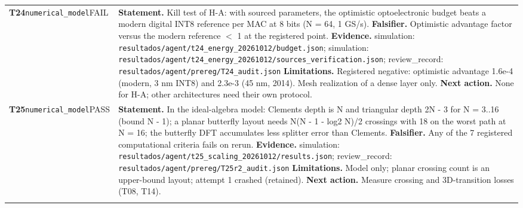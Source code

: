 \begin{longtable}{@{}>{\raggedright\arraybackslash}p{2.35cm}>{\raggedright\arraybackslash}p{13.2cm}@{}}
\textbf{T24}\newline \texttt{numerical\_\allowbreak{}model}\newline FAIL & \textbf{Statement.} Kill test of H-A: with sourced parameters, the optimistic optoelectronic budget beats a modern digital INT8 reference per MAC at 8 bits (N = 64, 1 GS/\allowbreak{}s). \newline \textbf{Falsifier.} Optimistic advantage factor versus the modern reference $<$ 1 at the registered point. \newline \textbf{Evidence.} simulation: \texttt{resultados/\allowbreak{}agent/\allowbreak{}t24\_\allowbreak{}energy\_\allowbreak{}20261012/\allowbreak{}budget.json}; simulation: \texttt{resultados/\allowbreak{}agent/\allowbreak{}t24\_\allowbreak{}energy\_\allowbreak{}20261012/\allowbreak{}sources\_\allowbreak{}verification.json}; review\_\allowbreak{}record: \texttt{resultados/\allowbreak{}agent/\allowbreak{}prereg/\allowbreak{}T24\_\allowbreak{}audit.json} \newline \textbf{Limitations.} Registered negative: optimistic advantage 1.6e-4 (modern, 3 nm INT8) and 2.3e-3 (45 nm, 2014). Mesh realization of a dense layer only. \newline \textbf{Next action.} None for H-A; other architectures need their own protocol. \\ \addlinespace[2pt]
\textbf{T25}\newline \texttt{numerical\_\allowbreak{}model}\newline PASS & \textbf{Statement.} In the ideal-algebra model: Clements depth is N and triangular depth 2N - 3 for N = 3..16 (bound N - 1); a planar butterfly layout needs N(N - 1 - log2 N)/\allowbreak{}2 crossings with 18 on the worst path at N = 16; the butterfly DFT accumulates less splitter error than Clements. \newline \textbf{Falsifier.} Any of the 7 registered computational criteria fails on rerun. \newline \textbf{Evidence.} simulation: \texttt{resultados/\allowbreak{}agent/\allowbreak{}t25\_\allowbreak{}scaling\_\allowbreak{}20261012/\allowbreak{}results.json}; review\_\allowbreak{}record: \texttt{resultados/\allowbreak{}agent/\allowbreak{}prereg/\allowbreak{}T25r2\_\allowbreak{}audit.json} \newline \textbf{Limitations.} Model only; planar crossing count is an upper-bound layout; attempt 1 crashed (retained). \newline \textbf{Next action.} Measure crossing and 3D-transition losses (T08, T14). \\ \addlinespace[2pt]

\end{longtable}
